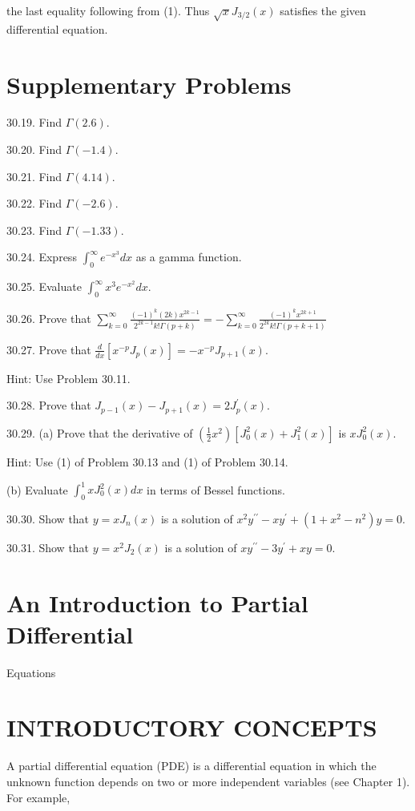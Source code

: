 \documentclass[10pt]{article}
\begin{document}
the last equality following from (1). Thus $\sqrt{x} J_{3 / 2}(x)$ satisfies the given differential equation.

\section*{Supplementary Problems}
30.19. Find $\Gamma(2.6)$.

30.20. Find $\Gamma(-1.4)$.

30.21. Find $\Gamma(4.14)$.

30.22. Find $\Gamma(-2.6)$.

30.23. Find $\Gamma(-1.33)$.

30.24. Express $\int_{0}^{\infty} e^{-x^{3}} d x$ as a gamma function.

30.25. Evaluate $\int_{0}^{\infty} x^{3} e^{-x^{2}} d x$.

30.26. Prove that $\sum_{k=0}^{\infty} \frac{(-1)^{k}(2 k) x^{2 k-1}}{2^{2 k-1} k ! \Gamma(p+k)}=-\sum_{k=0}^{\infty} \frac{(-1)^{k} x^{2 k+1}}{2^{2 k} k ! \Gamma(p+k+1)}$

30.27. Prove that $\frac{d}{d x}\left[x^{-p} J_{p}(x)\right]=-x^{-p} J_{p+1}(x)$.

Hint: Use Problem 30.11.

30.28. Prove that $J_{p-1}(x)-J_{p+1}(x)=2 J_{p}^{\prime}(x)$.

30.29. (a) Prove that the derivative of $\left(\frac{1}{2} x^{2}\right)\left[J_{0}^{2}(x)+J_{1}^{2}(x)\right]$ is $x J_{0}^{2}(x)$.

Hint: Use (1) of Problem 30.13 and (1) of Problem 30.14.

(b) Evaluate $\int_{0}^{1} x J_{0}^{2}(x) d x$ in terms of Bessel functions.

30.30. Show that $y=x J_{n}(x)$ is a solution of $x^{2} y^{\prime \prime}-x y^{\prime}+\left(1+x^{2}-n^{2}\right) y=0$.

30.31. Show that $y=x^{2} J_{2}(x)$ is a solution of $x y^{\prime \prime}-3 y^{\prime}+x y=0$.

\section*{An Introduction to Partial Differential}
 Equations\section*{INTRODUCTORY CONCEPTS}
A partial differential equation (PDE) is a differential equation in which the unknown function depends on two or more independent variables (see Chapter 1). For example,
\end{document}
